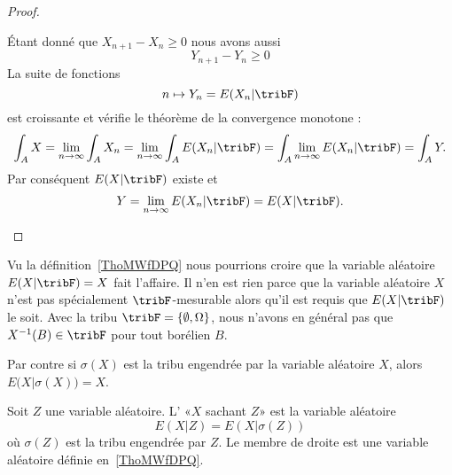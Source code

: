\begin{proof}
\begin{subproof}
		Étant donné que \( X_{n+1}-X_n\geq 0\) nous avons aussi
		\begin{equation}
			Y_{n+1}-Y_{n}\geq 0
		\end{equation}
		La suite de fonctions
		\begin{equation}
			n\mapsto Y_n=E(X_n|\tribF)
		\end{equation}
		est croissante et vérifie le théorème de la convergence monotone :
		\begin{equation}
			\int_A X=\lim_{n\to \infty} \int_A X_n =\lim_{n\to \infty} \int_A E(X_n|\tribF)=\int_A\lim_{n\to \infty } E(X_n|\tribF)=\int_A Y.
		\end{equation}
		Par conséquent \( E(X|\tribF)\) existe et
		\begin{equation}
			Y=\lim_{n\to \infty} E(X_n|\tribF)=E(X|\tribF).
		\end{equation}
	\end{subproof}
\end{proof}

\begin{normaltext}      \label{NORMooHPHOooUuJWHR}
	Vu la définition~\ref{ThoMWfDPQ} nous pourrions croire que la variable aléatoire \( E(X|\tribF)=X\) fait l'affaire. Il n'en est rien parce que la variable aléatoire \( X\) n'est pas spécialement \( \tribF\)-mesurable alors qu'il est requis que \( E(X|\tribF)\) le soit. Avec la tribu \( \tribF=\{ \emptyset,\Omega \}\), nous n'avons en général pas que \( X^{-1}(B)\in \tribF\) pour tout borélien \( B\).

	Par contre si \( \sigma(X)\) est la tribu engendrée par la variable aléatoire \( X\), alors \( E\big( X |\sigma(X) \big)=X\).
\end{normaltext}

\begin{definition}      \label{DefooKIHPooMhvirn}
	Soit \( Z\) une variable aléatoire. L' «\( X\) sachant \( Z\)» est la variable aléatoire
	\begin{equation}
		E(X|Z)=E(X|\sigma(Z))
	\end{equation}
	où \( \sigma(Z)\) est la tribu engendrée par \( Z\). Le membre de droite est une variable aléatoire définie en~\ref{ThoMWfDPQ}.
\end{definition}

